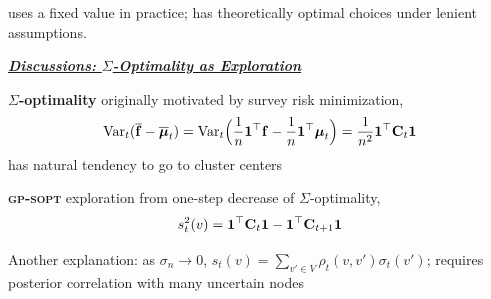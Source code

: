 \documentclass[size36_42,landscape]{a0poster}
\newenvironment{coldinglist}[2]	    {
\begin{list}
  {\textcolor{#2}{\ding{#1}}}{
\setlength{\parskip}{0pt}
\setlength{\itemsep}{0pt}
\setlength{\parsep}{0pt}
}
	}
	{\end{list}}
\def\bc{{\bf c}}
\def\be{{\bf e}}
\def\bff{{\bf f}}
\newcommand{\paragraphHeader}[1]{\vspace{1cm}\par{\LARGE\bf\color{darkpastelgreen} \it{\underline{\hspace{.5em}#1\hspace{.5em}}}}\par\vspace{1cm}}
\begin{document}
\begin{multicols}{3}
\begin{coldinglist}{112}{blue}
    \item {}
     uses a fixed value in practice; has theoretically optimal choices under lenient assumptions.
\end{coldinglist}


\paragraphHeader{Discussions: $\Sigma$-Optimality as Exploration}

\begin{coldinglist}{112}{blue}

    
        \item \textbf{$\Sigma$-optimality}
        originally motivated by survey risk minimization,
    \begin{equation*}
        {\rm Var}_t(\overline{\bff} - \overline{\bmu}_t) 
        = {\rm Var}_t\Bigl(\frac{1}{n}\mathbf{1}^\top\bff - \frac{1}{n}\mathbf{1}^\top\mathbf{\bmu}_t\Bigr)
        = \frac{1}{n^2} \mathbf{1}^\top \bC_t \mathbf{1}
    \end{equation*}
has natural tendency to go to cluster centers

    \item \textbf{\textsc{gp-sopt}} exploration from one-step decrease of $\Sigma$-optimality,
    \begin{equation*}
    s_t^2(v) = \mathbf{1}^\top\mathbf{C}_t\mathbf{1}
-
\mathbf{1}^\top\mathbf{C}_{t+1}\mathbf{1}
    \end{equation*}


    \item 
    Another explanation: as $\sigma_n\to0$, {\color{red} $s_t(v) = \sum_{v'\in V}\rho_t(v,v')\sigma_t(v')$}; requires posterior correlation with many uncertain nodes
    


\end{coldinglist}
\end{multicols}
\end{document}
